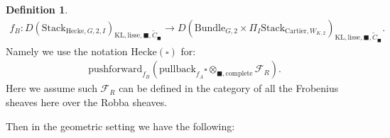 \documentclass[12pt]{book}
\theoremstyle{definition}
\newtheorem{definition}{Definition}
\begin{document}
\begin{definition}
\begin{align}
f_B: D(\mathrm{Stack}_{\mathrm{Hecke},G,2,I})_{\text{KL},\mathrm{lisse},\blacksquare,\widetilde{C}_\blacksquare} \rightarrow D(\mathrm{Bundle}_{G,2}\times \Pi_I \mathrm{Stack}_{\mathrm{Cartier},W_{K,2}})_{\text{KL},\mathrm{lisse},\blacksquare,\widetilde{C}_\blacksquare}.
\end{align}
Namely we use the notation $\mathrm{Hecke}(\square)$ for:
\begin{align}
\mathrm{pushforward}_{f_B}(\mathrm{pullback}_{f_A}\square\otimes_{\blacksquare,\mathrm{complete}}\mathcal{F}_R).
\end{align}
Here we assume such $\mathcal{F}_R$ can be defined in the category of all the Frobenius sheaves here over the Robba sheaves.
\end{definition}

Then in the geometric setting we have the following:
\end{document}
